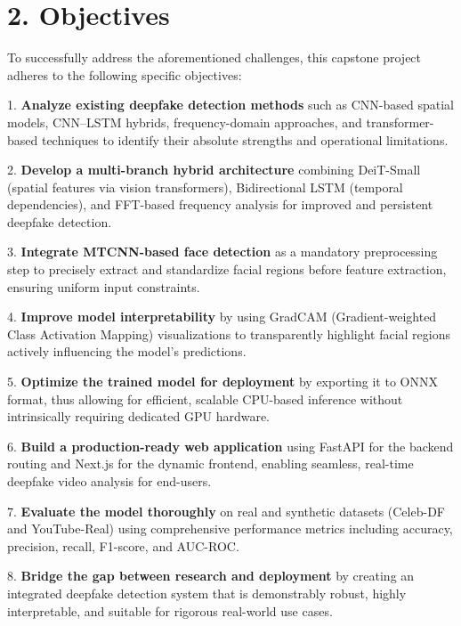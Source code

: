 \documentclass[12pt,a4paper]{article}
\begin{document}
\section{2. Objectives}
To successfully address the aforementioned challenges, this capstone project adheres to the following specific objectives:

1.	\textbf{Analyze existing deepfake detection methods} such as CNN-based spatial models, CNN–LSTM hybrids, frequency-domain approaches, and transformer-based techniques to identify their absolute strengths and operational limitations.

2.	\textbf{Develop a multi-branch hybrid architecture} combining DeiT-Small (spatial features via vision transformers), Bidirectional LSTM (temporal dependencies), and FFT-based frequency analysis for improved and persistent deepfake detection.

3.	\textbf{Integrate MTCNN-based face detection} as a mandatory preprocessing step to precisely extract and standardize facial regions before feature extraction, ensuring uniform input constraints.

4.	\textbf{Improve model interpretability} by using GradCAM (Gradient-weighted Class Activation Mapping) visualizations to transparently highlight facial regions actively influencing the model’s predictions.

5.	\textbf{Optimize the trained model for deployment} by exporting it to ONNX format, thus allowing for efficient, scalable CPU-based inference without intrinsically requiring dedicated GPU hardware.

6.	\textbf{Build a production-ready web application} using FastAPI for the backend routing and Next.js for the dynamic frontend, enabling seamless, real-time deepfake video analysis for end-users.

7.	\textbf{Evaluate the model thoroughly} on real and synthetic datasets (Celeb-DF and YouTube-Real) using comprehensive performance metrics including accuracy, precision, recall, F1-score, and AUC-ROC.

8.	\textbf{Bridge the gap between research and deployment} by creating an integrated deepfake detection system that is demonstrably robust, highly interpretable, and suitable for rigorous real-world use cases.
\end{document}
